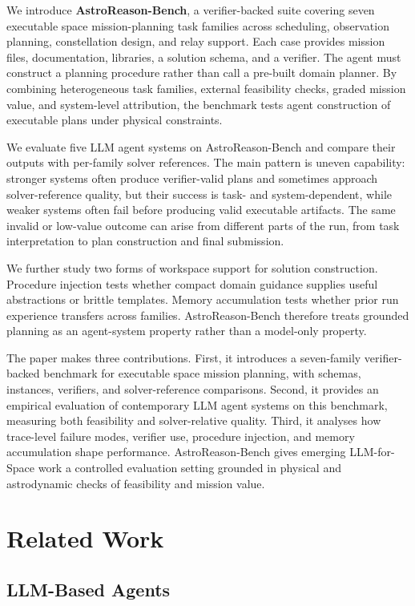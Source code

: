 \documentclass[11pt]{article}
\begin{document}
We introduce \textbf{AstroReason-Bench}, a verifier-backed suite covering seven executable space mission-planning task families across scheduling, observation planning, constellation design, and relay support. Each case provides mission files, documentation, libraries, a solution schema, and a verifier. The agent must construct a planning procedure rather than call a pre-built domain planner. By combining heterogeneous task families, external feasibility checks, graded mission value, and system-level attribution, the benchmark tests agent construction of executable plans under physical constraints.

We evaluate five LLM agent systems on AstroReason-Bench and compare their outputs with per-family solver references. The main pattern is uneven capability: stronger systems often produce verifier-valid plans and sometimes approach solver-reference quality, but their success is task- and system-dependent, while weaker systems often fail before producing valid executable artifacts. The same invalid or low-value outcome can arise from different parts of the run, from task interpretation to plan construction and final submission.

We further study two forms of workspace support for solution construction. Procedure injection tests whether compact domain guidance supplies useful abstractions or brittle templates. Memory accumulation tests whether prior run experience transfers across families. AstroReason-Bench therefore treats grounded planning as an agent-system property rather than a model-only property.

The paper makes three contributions. First, it introduces a seven-family verifier-backed benchmark for executable space mission planning, with schemas, instances, verifiers, and solver-reference comparisons. Second, it provides an empirical evaluation of contemporary LLM agent systems on this benchmark, measuring both feasibility and solver-relative quality. Third, it analyses how trace-level failure modes, verifier use, procedure injection, and memory accumulation shape performance. AstroReason-Bench gives emerging LLM-for-Space work a controlled evaluation setting grounded in physical and astrodynamic checks of feasibility and mission value.


\section{Related Work}

\subsection{LLM-Based Agents}
\end{document}
